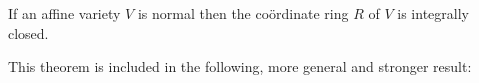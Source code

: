 If an affine variety $V$ is normal then the coördinate ring $R$ of $V$ is integrally closed.

This theorem is included in the following, more general and stronger result:
